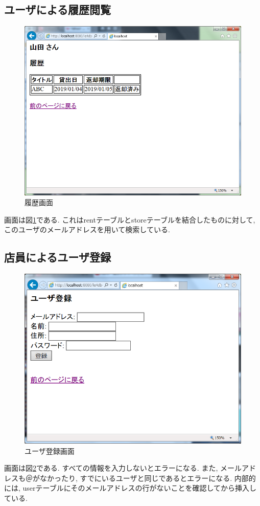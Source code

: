 \documentclass{jarticle}
\begin{document}
\subsection{ユーザによる履歴閲覧}
\begin{figure}[tp]
\begin{center}
\includegraphics[scale=0.5]{history.png}
\end{center}
\caption{履歴画面}
\label{fig:history}
\end{figure}
画面は図\ref{fig:history}である. これはrentテーブルとstoreテーブルを結合したものに対して, このユーザのメールアドレスを用いて検索している.

\subsection{店員によるユーザ登録}
\begin{figure}[tp]
\begin{center}
\includegraphics[scale=0.5]{add_user.png}
\end{center}
\caption{ユーザ登録画面}
\label{fig:add_user}
\end{figure}
画面は図\ref{fig:add_user}である. すべての情報を入力しないとエラーになる. また, メールアドレスも＠がなかったり, すでにいるユーザと同じであるとエラーになる. 内部的には, userテーブルにそのメールアドレスの行がないことを確認してから挿入している.
\end{document}

